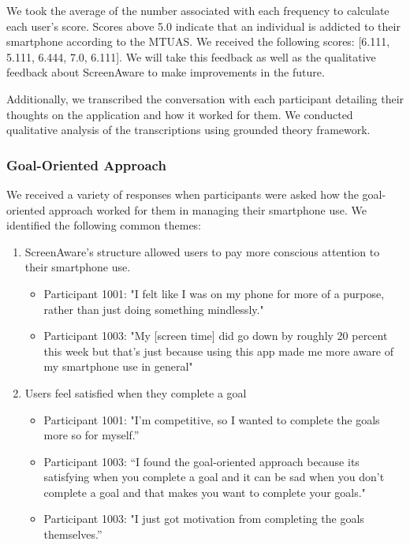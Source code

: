 \documentclass[12pt, title page, manuscript, nonacm]{acmart}
\begin{document}
We took the average of the number associated with each frequency to calculate each user's score. Scores above 5.0 indicate that an individual is addicted to their smartphone according to the MTUAS. We received the following scores: [6.111, 5.111, 6.444, 7.0, 6.111]. 
We will take this feedback as well as the qualitative feedback about ScreenAware to make improvements in the future.
\par Additionally, we transcribed the conversation with each participant detailing their thoughts on the application and how it worked for them. We conducted qualitative analysis of the transcriptions using grounded theory framework.
\subsubsection*{Goal-Oriented Approach}
We received a variety of responses when participants were asked how the goal-oriented approach worked for them in managing their smartphone use. We identified the following common themes: 
\begin{enumerate}
    \item ScreenAware's structure allowed users to pay more conscious attention to their smartphone use.
    \begin{itemize}
        \item Participant 1001: "I felt like I was on my phone for more of a purpose, rather than just doing something mindlessly."
        \item Participant 1003: "My [screen time] did go down by roughly 20 percent this week but that's just because using this app made me more aware of my smartphone use in general"
    \end{itemize}
    \item Users feel satisfied when they complete a goal
    \begin{itemize}
        \item Participant 1001: "I’m competitive, so I wanted to complete the goals more so for myself.”
        \item Participant 1003: “I found the goal-oriented approach because its satisfying when you complete a goal and it can be sad when you don't complete a goal and that makes you want to complete your goals."
        \item Participant 1003: "I just got motivation from completing the goals themselves.”
    \end{itemize}
\end{enumerate}
\end{document}
